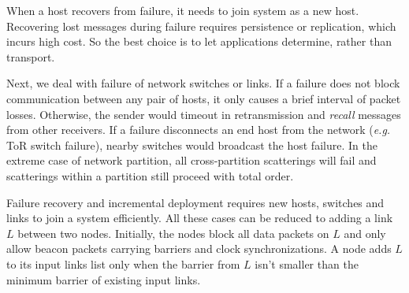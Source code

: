 When a host recovers from failure, it needs to join \sys system as a new host.
Recovering lost messages during failure requires persistence or replication, which incurs high cost. So the best choice is to let applications determine, rather than \sys transport.

Next, we deal with failure of network switches or links.
If a failure does not block communication between any pair of hosts, it only causes a brief interval of packet losses.
Otherwise, the sender would timeout in retransmission and \textit{recall} messages from other receivers.
If a failure disconnects an end host from the network (\textit{e.g.} ToR switch failure), nearby switches would broadcast the host failure.
In the extreme case of network partition, all cross-partition scatterings will fail and scatterings within a partition still proceed with total order.




Failure recovery and incremental deployment requires new hosts, switches and links to join a \sys system efficiently.
All these cases can be reduced to adding a link $L$ between two nodes.
Initially, the nodes block all data packets on $L$ and only allow beacon packets carrying barriers and clock synchronizations.
A node adds $L$ to its input links list only when the barrier from $L$ isn't smaller than the minimum barrier of existing input links.

